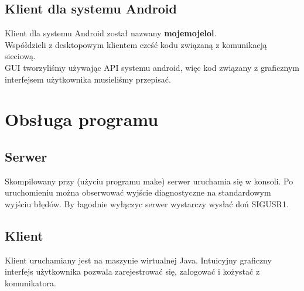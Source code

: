 \documentclass[10pt,a4paper]{article}
\begin{document}
	\subsection{Klient dla systemu Android}
		Klient dla systemu Android został nazwany \textbf{mojemojelol}.\\
		Współdzieli z desktopowym klientem cześć kodu związaną z komunikacją sieciową.\\
		GUI tworzyliśmy używając API systemu android, więc kod związany z graficznym interfejsem użytkownika musieliśmy  przepisać.
	
\section{Obsługa programu}
	\subsection{Serwer}
		Skompilowany przy (użyciu programu make) serwer uruchamia się w konsoli.
		Po uruchomieniu można obserwować wyjście diagnostyczne na standardowym wyjściu błędów.
		By łagodnie wyłączyc serwer wystarczy wysłać doń SIGUSR1.
	\subsection{Klient}
		Klient uruchamiany jest na maszynie wirtualnej Java.
		Intuicyjny graficzny interfejs użytkownika pozwala zarejestrować się, zalogować i kożystać z komunikatora.
\end{document}
